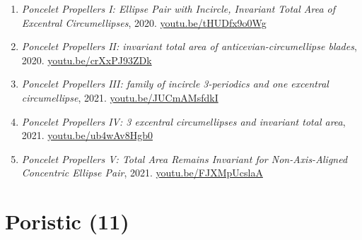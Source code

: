\documentclass[12pt]{article}
\begin{document}
\begin{enumerate}[resume]
\item \textit{Poncelet Propellers I: Ellipse Pair with Incircle, Invariant Total Area of Excentral Circumellipses}, 2020. \href{https://youtu.be/tHUDfx9o0Wg}{\url{youtu.be/tHUDfx9o0Wg}}
\item \textit{Poncelet Propellers II: invariant total area of anticevian-circumellipse blades}, 2020. \href{https://youtu.be/crXxPJ93ZDk}{\url{youtu.be/crXxPJ93ZDk}}
\item \textit{Poncelet Propellers III: family of incircle 3-periodics and one excentral circumellipse}, 2021. \href{https://youtu.be/JUCmAMsfdkI}{\url{youtu.be/JUCmAMsfdkI}}
\item \textit{Poncelet Propellers IV: 3 excentral circumellipses and invariant total area}, 2021. \href{https://youtu.be/ub4wAv8Hgb0}{\url{youtu.be/ub4wAv8Hgb0}}
\item \textit{Poncelet Propellers V: Total Area Remains Invariant for Non-Axis-Aligned Concentric Ellipse Pair}, 2021. \href{https://youtu.be/FJXMpUcslaA}{\url{youtu.be/FJXMpUcslaA}}
\end{enumerate}

\section{Poristic (11)}
\end{document}
